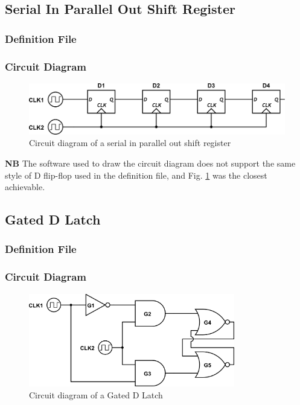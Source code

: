 \documentclass[a4paper,10pt]{article}
\begin{document}
\subsection{Serial In Parallel Out Shift Register}

\subsubsection{Definition File}


\subsubsection{Circuit Diagram}
\begin{figure}[h]
 \centering
 \includegraphics[width=12cm]{../../examples/sipo.png}
 \caption{Circuit diagram of a serial in parallel out shift register}
 \label{fig:example-sipo}
\end{figure}

\textbf{NB} The software used to draw the circuit diagram does not support the same style of D flip-flop used in the definition file, and Fig. \ref{fig:example-sipo} was the closest achievable.

\subsection{Gated D Latch}

\subsubsection{Definition File}


\subsubsection{Circuit Diagram}
\begin{figure}[h]
 \centering
 \includegraphics[width=9cm]{../../examples/gated-d-latch.png}
 \caption{Circuit diagram of a Gated D Latch}
 \label{fig:example-dlatch}
\end{figure}
\end{document}
